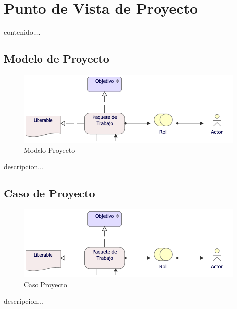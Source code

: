 \section{Punto de Vista de Proyecto}
contenido....
\subsection{Modelo de Proyecto}
\begin{figure}[h!]
	\centering
	\includegraphics[width=.9\linewidth]{imgs/modelo/Proyecto}
	\caption{Modelo Proyecto}
\end{figure}
descripcion...

\subsection{Caso  de Proyecto}
\begin{figure}[h!]
	\centering
	\includegraphics[width=.9\linewidth]{imgs/caso/Proyecto}
	\caption{Caso Proyecto}
\end{figure}
descripcion...